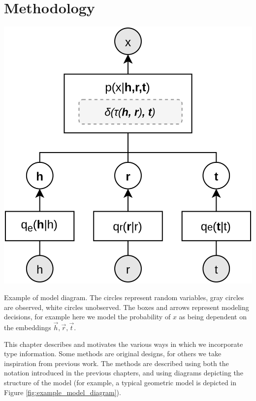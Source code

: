 \chapter{Methodology}
\label{ch:methodology}

\begin{marginfigure}
    \centering
    \includegraphics[width=1.\linewidth]{figures/base.png}
    \caption[Example of model diagram.]{Example of model diagram. The circles represent random variables, gray circles are observed, white circles unobserved. The boxes and arrows represent modeling decisions, for example here we model the probability of $x$ as being dependent on the embeddings $\vec{h}, \vec{r}, \vec{t}$. }
    \label{fig:example_model_diagram}
\end{marginfigure}

This chapter describes and motivates the various ways in which we incorporate type information.
Some methods are original designs, for others we take inspiration from previous work.
The methods are described using both the notation introduced in the previous chapters, and using diagrams depicting the structure of the model (for example, a typical geometric model is depicted in Figure \ref{fig:example_model_diagram}).

